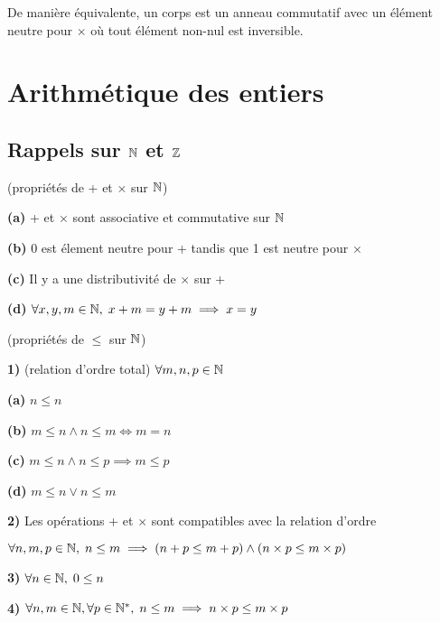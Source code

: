 \documentclass[a4paper, 12pt]{article}
\begin{document}
\begin{remark}
    De manière équivalente, un corps est un anneau commutatif avec un élément neutre pour $\times$ où tout élément non-nul est inversible.
\end{remark}

\section{Arithmétique des entiers}

\subsection{Rappels sur $\mathbb{N}$ et $\mathbb{Z}$}

\vspace{1cm}

\begin{theorem}
    (propriétés de + et $\times$ sur $\mathbb{N}$)
    \item \textbf{(a)} + et $\times$ sont associative et commutative sur $\mathbb{N}$

    \item \textbf{(b)} 0 est élement neutre pour + tandis que 1 est neutre pour $\times$

    \item \textbf{(c)} Il y a une distributivité de $\times$ sur +

    \item \textbf{(d)} $\forall x, y, m \in \mathbb{N}, \; x + m = y + m \implies x = y$
\end{theorem}

\begin{theorem}
    (propriétés de $\leq$ sur $\mathbb{N}$)

    \item \textbf{1)} (relation d'ordre total) $\forall m, n, p \in \mathbb{N}$
    
    \item \textbf{(a)} $n \leq n$
    \item \textbf{(b)} $m \leq n \land n \leq m \iff m = n$
    \item \textbf{(c)} $m \leq n \land n \leq p \implies m \leq p$
    \item \textbf{(d)} $m \leq n \lor n \leq m$
    
    \item \textbf{2)} Les opérations + et $\times$ sont compatibles avec la relation d'ordre

        $\forall n, m, p \in \mathbb{N}, \; n \leq m \implies (n + p \leq m + p) \land (n \times p \leq m \times p)$

    \item \textbf{3)} $\forall n \in \mathbb{N}, \; 0 \leq n$
    \item \textbf{4)} $\forall n, m \in \mathbb{N}, \forall p \in \mathbb{N}^*, \; n \leq m \implies n \times p \leq m \times p$
\end{theorem}
\end{document}
